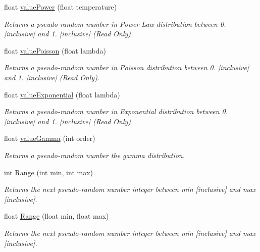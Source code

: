 \begin{DoxyCompactItemize}
float \hyperlink{class_m_t_random_aef2e82a3345b85fdc075476b2c1f81de}{value\+Power} (float temperature)
\begin{DoxyCompactList}\small\item\em Returns a pseudo-\/random number in Power Law distribution between 0. \mbox{[}inclusive\mbox{]} and 1. \mbox{[}inclusive\mbox{]} (Read Only). \end{DoxyCompactList}\item 
float \hyperlink{class_m_t_random_a5bfa094b57244746389d4ab89284c8a7}{value\+Poisson} (float lambda)
\begin{DoxyCompactList}\small\item\em Returns a pseudo-\/random number in Poisson distribution between 0. \mbox{[}inclusive\mbox{]} and 1. \mbox{[}inclusive\mbox{]} (Read Only). \end{DoxyCompactList}\item 
float \hyperlink{class_m_t_random_a0f9deae2e629a2e8a9164d7f53e35537}{value\+Exponential} (float lambda)
\begin{DoxyCompactList}\small\item\em Returns a pseudo-\/random number in Exponential distribution between 0. \mbox{[}inclusive\mbox{]} and 1. \mbox{[}inclusive\mbox{]} (Read Only). \end{DoxyCompactList}\item 
float \hyperlink{class_m_t_random_abbd3cdd52723d6540e1ec30ab105e31e}{value\+Gamma} (int order)
\begin{DoxyCompactList}\small\item\em Returns a pseudo-\/random number the gamma distribution. \end{DoxyCompactList}\item 
int \hyperlink{class_m_t_random_ab1d2aae9abe7a2d01a8a93ecb697248c}{Range} (int min, int max)
\begin{DoxyCompactList}\small\item\em Returns the next pseudo-\/random number integer between {\itshape min}  \mbox{[}inclusive\mbox{]} and {\itshape max}  \mbox{[}inclusive\mbox{]}. \end{DoxyCompactList}\item 
float \hyperlink{class_m_t_random_a3ffd8b27980f7f416d33c3823b0c2611}{Range} (float min, float max)
\begin{DoxyCompactList}\small\item\em Returns the next pseudo-\/random number integer between {\itshape min}  \mbox{[}inclusive\mbox{]} and {\itshape max}  \mbox{[}inclusive\mbox{]}. \end{DoxyCompactList}\item 

\end{DoxyCompactItemize}
